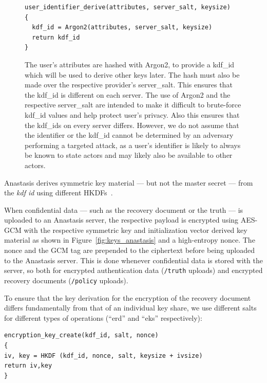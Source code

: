 \begin{figure}[H]
\begin{lstlisting}
user_identifier_derive(attributes, server_salt, keysize)
{
  kdf_id = Argon2(attributes, server_salt, keysize)
  return kdf_id
}
\end{lstlisting}
\caption[Use of Argon2 to derive user attributes]{The user's attributes are hashed with Argon2, to provide a
  kdf\_id which will be used to derive other keys later. The hash must
  also be made over the respective provider's server\_salt. This
  ensures that the kdf\_id is different on each server. The use of
  Argon2 and the respective server\_salt are intended to make it
  difficult to brute-force kdf\_id values and help protect user’s
  privacy. Also this ensures that the kdf\_ids on every server
  differs. However, we do not assume that the identifier or the
  kdf\_id cannot be determined by an adversary performing a targeted
  attack, as a user’s identifier is likely to always be known to state
  actors and may likely also be available to other actors.}
\label{fig:argon2}
\end{figure}

Anastasis derives symmetric key material --- but not the master secret --- from the {\em kdf id} using different HKDFs~\cite{krawczyk2010}.

When confidential data --- such as the recovery document or the truth
--- is uploaded to an Anastasis server, the respective payload is
encrypted using AES-GCM with the respective symmetric key and
initialization vector derived key material as shown in
Figure~\ref{fig:keys_anastasis} and a high-entropy nonce.  The nonce
and the GCM tag are prepended to the ciphertext before being uploaded
to the Anastasis server. This is done whenever confidential data is
stored with the server, so both for encrypted authentication data
(\texttt{/truth} uploads) and encrypted recovery documents
(\texttt{/policy} uploads).

To ensure that the key derivation for the encryption of the recovery
document differs fundamentally from that of an individual key share,
we use different salts for different types of operations (“erd” and
“eks” respectively):

\begin{lstlisting}
encryption_key_create(kdf_id, salt, nonce)
{
iv, key = HKDF (kdf_id, nonce, salt, keysize + ivsize)
return iv,key
}
\end{lstlisting}

